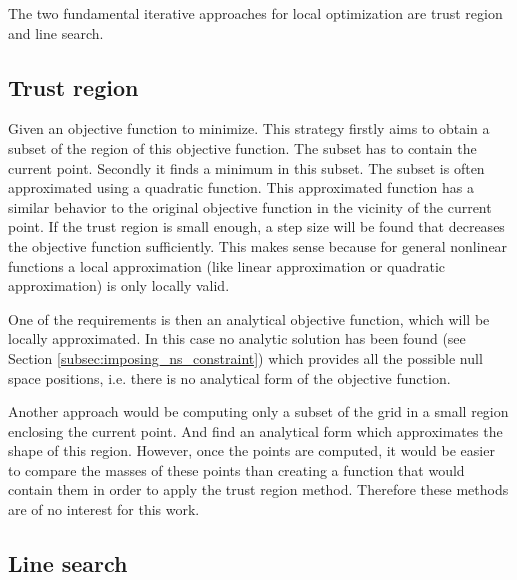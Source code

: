 The two fundamental iterative approaches for local optimization	 are trust region and line search.

\subsection{Trust region}
\label{subsec:tregion}

Given an objective function to minimize. This  strategy firstly aims to obtain a subset of the region of this objective function. The subset has to contain the current point. Secondly it finds a minimum in this subset. The subset is often approximated using a quadratic function. This approximated function has a similar behavior to the original objective function in the vicinity of the current point. If the trust region is small enough, a step size will be found that decreases the objective function sufficiently. This makes sense because for general nonlinear functions a local approximation (like linear approximation or quadratic approximation)  is only locally valid.



One of the requirements is then an analytical objective function, which will be locally approximated. In this case no analytic solution has been found (see Section \ref{subsec:imposing_ns_constraint}) which  provides all the possible null space positions, i.e. there is no analytical form of the objective function.


Another approach would be computing only a subset of the grid in a small region enclosing the current point. And find an analytical form which approximates the shape of this region. However, once the points are computed, it would be easier to compare the masses of these points than creating a function that would contain them in order to apply the trust region method. Therefore these methods are of no interest for this work.





\subsection{Line search}
\label{subsec:lsearch}



